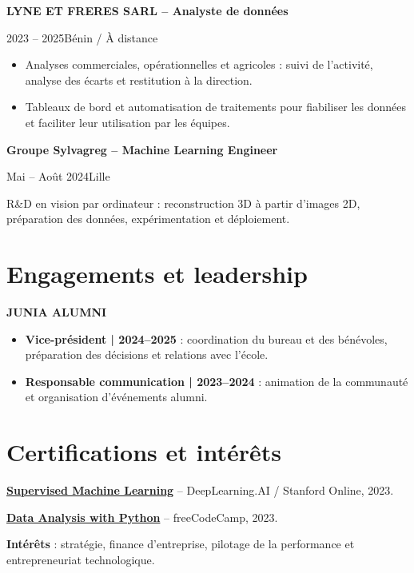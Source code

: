 \documentclass[10pt,a4paper]{article}
\newcommand{\role}[3]{\vspace{4pt}\textbf{#1}\par {\color{muted}#2\enspace\textbullet\enspace #3}\par}
\begin{document}
\begin{minipage}[t]{0.68\textwidth}
\role{LYNE ET FRERES SARL -- Analyste de données}{2023 -- 2025}{Bénin / À distance}
\begin{itemize}
\item Analyses commerciales, opérationnelles et agricoles : suivi de l'activité, analyse des écarts et restitution à la direction.
\item Tableaux de bord et automatisation de traitements pour fiabiliser les données et faciliter leur utilisation par les équipes.
\end{itemize}

\role{Groupe Sylvagreg -- Machine Learning Engineer}{Mai -- Août 2024}{Lille}
R\&D en vision par ordinateur : reconstruction 3D à partir d'images 2D, préparation des données, expérimentation et déploiement.

\section{Engagements et leadership}
\textbf{JUNIA ALUMNI}\par
\begin{itemize}
\item \textbf{Vice-président | 2024--2025} : coordination du bureau et des bénévoles, préparation des décisions et relations avec l'école.
\item \textbf{Responsable communication | 2023--2024} : animation de la communauté et organisation d'événements alumni.
\end{itemize}

\section{Certifications et intérêts}
\href{https://www.coursera.org/account/accomplishments/verify/MWJS4Q3S2C3L}{\textbf{Supervised Machine Learning}} -- DeepLearning.AI / Stanford Online, 2023.\par
\href{https://www.freecodecamp.org/certification/amiche/data-analysis-with-python-v7}{\textbf{Data Analysis with Python}} -- freeCodeCamp, 2023.\par
\vspace{3pt}
\textbf{Intérêts} : stratégie, finance d'entreprise, pilotage de la performance et entrepreneuriat technologique.
\end{minipage}
\end{document}
